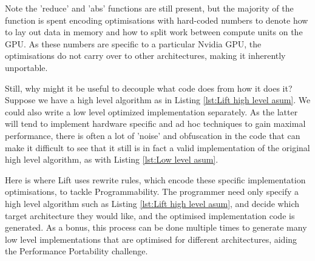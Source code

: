 \documentclass{l4proj}
\begin{document}
Note the 'reduce' and 'abs' functions are still present, but the majority of the function is spent encoding optimisations with hard-coded numbers to denote how to lay out data in memory and how to split work between compute units on the GPU. As these numbers are specific to a particular Nvidia GPU, the optimisations do not carry over to other architectures, making it inherently unportable. 


Still, why might it be useful to decouple what code does from how it does it? Suppose we have a high level algorithm as in Listing \ref{lst:Lift high level asum}. We could also write a low level optimized implementation separately. As the latter will tend to implement hardware specific and ad hoc techniques to gain maximal performance, there is often a lot of 'noise' and obfuscation in the code that can make it difficult to see that it still is in fact a valid implementation of the original high level algorithm, as with Listing \ref{lst:Low level asum}. 

Here is where Lift uses rewrite rules, which encode these specific implementation optimisations, to tackle Programmability. The programmer need only specify a high level algorithm such as Listing \ref{lst:Lift high level asum}, and decide which target architecture they would like, and the optimised implementation code is generated. 
As a bonus, this process can be done multiple times to generate many low level implementations that are optimised for different architectures, aiding the Performance Portability challenge.



\end{document}
